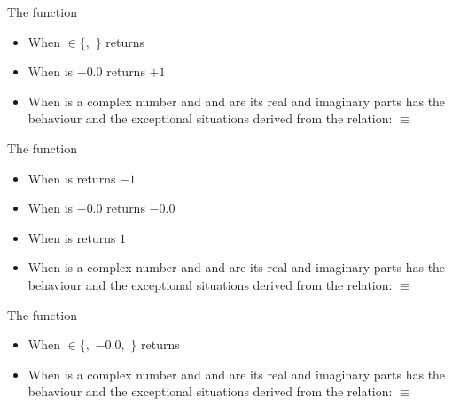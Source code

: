 \documentclass[../Exponentials-Logarithms-Trigonometry.tex]{subfiles}
\begin{document}
\noindent
The function 
\begin{itemize}
\item When  $\in \{$$,$
  $\}$ returns 
\item When  is $-0.0$ returns $+1$
\item When  is a complex number and   and 
  are its real and imaginary parts has the behaviour and the exceptional
  situations derived from the relation: \code{)}
  $\equiv$ \code{ (-
  }\code{)))}
\end{itemize}

\noindent
The function 
\begin{itemize}
\item When  is  returns
  $-1$
\item When  is $-0.0$ returns $-0.0$
\item When  is  returns
  $1$
\item When  is a complex number and   and 
  are its real and imaginary parts has the behaviour and the exceptional
  situations derived from the relation: \code{)}
  $\equiv$ \code{ (-
  }\code{)))}
\end{itemize}

\noindent
The function 
\begin{itemize}
\item When  $\in \{$$,$
  $-0.0$$,$ $\}$ returns 
\item When  is a complex number and   and 
  are its real and imaginary parts has the behaviour and the exceptional
  situations derived from the relation: \code{)}
  $\equiv$ \code{ (-
  }\code{)))}
\end{itemize}
\end{document}
